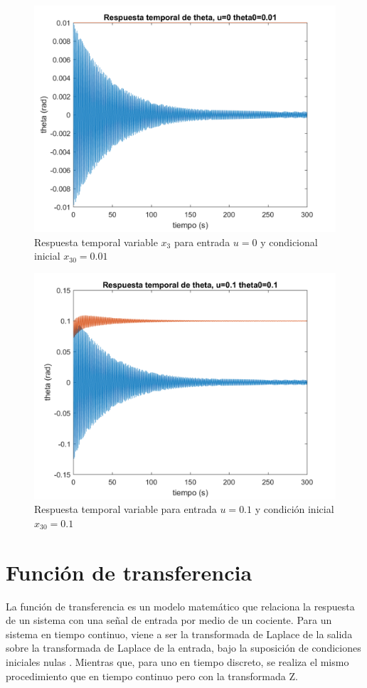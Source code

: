 \documentclass[journal]{IEEEtran}
\begin{document}
\begin{figure}[h!]
\caption{Respuesta temporal variable $x_3$ para entrada $u=0$ y condicional inicial $x_{30}=0.01$\label{fig:t0.01}}
  \centering
\includegraphics[scale=0.19]{Graficaslvsnl/t0_01.png}
\end{figure}
       
\begin{figure}[h!]
\caption{Respuesta temporal variable para entrada $u=0.1$ y condición inicial $x_{30}=0.1$\label{fig:t0.1}}
  \centering
\includegraphics[scale=0.19]{Graficaslvsnl/t0_1.png}
\end{figure}

\section{Función de transferencia}
La función de transferencia es un modelo matemático que relaciona la respuesta de un sistema con una señal de entrada por medio de un cociente. Para un sistema en tiempo continuo, viene a ser la transformada de Laplace de la salida sobre la transformada de Laplace de la entrada, bajo la suposición de condiciones iniciales nulas \cite{wiki:state} . Mientras que, para uno en tiempo discreto, se realiza el mismo procedimiento que en tiempo continuo pero con la transformada Z.   
\end{document}
